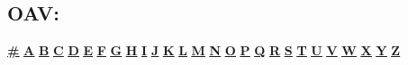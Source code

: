 \subsection[Oav]{\huge OAV:}
	\begin{center}
		\hyperlink{OA\#}{\textbf{\underline{\#}}}
		\hyperlink{OA}{\textbf{\underline{A}}} \hyperlink{OB}{\textbf{\underline{B}}} \hyperlink{OC}{\textbf{\underline{C}}} \hyperlink{OD}{\textbf{\underline{D}}} \hyperlink{OE}{\textbf{\underline{E}}} \hyperlink{OF}{\textbf{\underline{F}}} \hyperlink{OG}{\textbf{\underline{G}}} \hyperlink{OH}{\textbf{\underline{H}}} \hyperlink{OI}{\textbf{\underline{I}}} \hyperlink{OJ}{\textbf{\underline{J}}} \hyperlink{OK}{\textbf{\underline{K}}} \hyperlink{OL}{\textbf{\underline{L}}} \hyperlink{OM}{\textbf{\underline{M}}} \hyperlink{ON}{\textbf{\underline{N}}} \hyperlink{OO}{\textbf{\underline{O}}} \hyperlink{OP}{\textbf{\underline{P}}} \hyperlink{OQ}{\textbf{\underline{Q}}} \hyperlink{OR}{\textbf{\underline{R}}} \hyperlink{OS}{\textbf{\underline{S}}} \hyperlink{OT}{\textbf{\underline{T}}} \hyperlink{OU}{\textbf{\underline{U}}} \hyperlink{OV}{\textbf{\underline{V}}} \hyperlink{OW}{\textbf{\underline{W}}} \hyperlink{OX}{\textbf{\underline{X}}} 
		\hyperlink{OY}{\textbf{\underline{Y}}} \hyperlink{OZ}{\textbf{\underline{Z}}}
	\end{center}	
	
